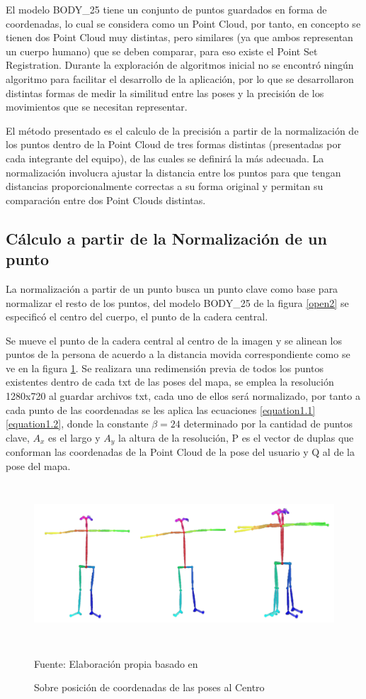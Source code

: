 El modelo BODY\_25 tiene un conjunto de puntos guardados en forma de coordenadas, lo cual se considera como un Point Cloud, por tanto, en concepto se tienen dos Point Cloud muy distintas, pero similares (ya que ambos representan un cuerpo humano) que se deben comparar, para eso existe el Point Set Registration. Durante la exploración de algoritmos inicial no se encontró ningún algoritmo para facilitar el desarrollo de la aplicación, por lo que se desarrollaron distintas formas de medir la similitud entre las poses y la precisión de los movimientos que se necesitan representar.

El método presentado es el calculo de la precisión a partir de la normalización de los puntos dentro de la Point Cloud de tres formas distintas (presentadas por cada integrante del equipo), de las cuales se definirá la más adecuada. La normalización involucra ajustar la distancia entre los puntos para que tengan distancias proporcionalmente correctas a su forma original y permitan su comparación entre dos Point Clouds distintas.


\subsection{Cálculo a partir de la Normalización de un punto}

La normalización a partir de un punto busca un punto clave como base para normalizar el resto de los puntos, del modelo BODY\_25 de la figura \ref{open2} se especificó el centro del cuerpo, el punto de la cadera central.

Se mueve el punto de la cadera central al centro de la imagen y se alinean los puntos de la persona de acuerdo a la distancia movida correspondiente como se ve en la figura \ref{overpose}. Se realizara una redimensión previa de todos los puntos existentes dentro de cada txt de las poses del mapa, se emplea la resolución 1280x720 al guardar archivos txt, cada uno de ellos será normalizado, por tanto a cada punto de las coordenadas se les aplica las ecuaciones  \ref{equation1.1} \ref{equation1.2}, donde la constante $\beta = 24$ determinado por la cantidad de puntos clave, $A_x$ es el largo y $A_y$ la altura de la resolución, P es el vector de duplas que conforman las coordenadas de la Point Cloud de la pose del usuario y Q al de la pose del mapa.
\begin{figure}[t!]
	\centering
	\includegraphics[width=14cm,height=6cm,]{./Images/overpose.png}
	\caption{Sobre posición de coordenadas de las poses al Centro}
	\footnotesize Fuente: Elaboración propia basado en \cite{8765346}
	\label{overpose}
\end{figure}

